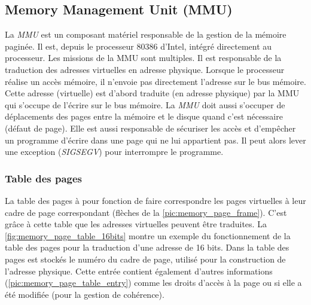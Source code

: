 \subsection{Memory Management Unit (MMU)} \label{sec:mmu}
La \textit{MMU} est un composant matériel responsable de la gestion de la mémoire paginée. Il est, depuis le processeur 80386 d'Intel, intégré directement au processeur. Les missions de la MMU sont multiples. Il est responsable de la traduction des adresses virtuelles en adresse physique. Lorsque le processeur réalise un accès mémoire, il n'envoie pas directement l'adresse sur le bus mémoire. Cette adresse (virtuelle) est d'abord traduite (en adresse physique) par la MMU qui s'occupe de l'écrire sur le bus mémoire. La \textit{MMU} doit aussi s'occuper de déplacements des pages entre la mémoire et le disque quand c'est nécessaire (défaut de page). Elle est aussi responsable de sécuriser les accès et d'empêcher un programme d'écrire dans une page qui ne lui appartient pas. Il peut alors lever une exception (\textit{SIGSEGV}) pour interrompre le programme. 

\subsubsection{Table des pages} \label{sec:table_page}
La table des pages à pour fonction de faire correspondre les pages virtuelles à leur cadre de page correspondant (flèches de la \autoref{pic:memory_page_frame}). C'est grâce à cette table que les adresses virtuelles peuvent être traduites. La \autoref{fig:memory_page_table_16bits} montre un exemple du fonctionnement de la table des pages pour la traduction d'une adresse de 16 bits. Dans la table des pages est stockés le numéro du cadre de page, utilisé pour la construction de l'adresse physique. Cette entrée contient également d'autres informations (\autoref{pic:memory_page_table_entry}) comme les droits d'accès à la page ou si elle a été modifiée (pour la gestion de cohérence).


